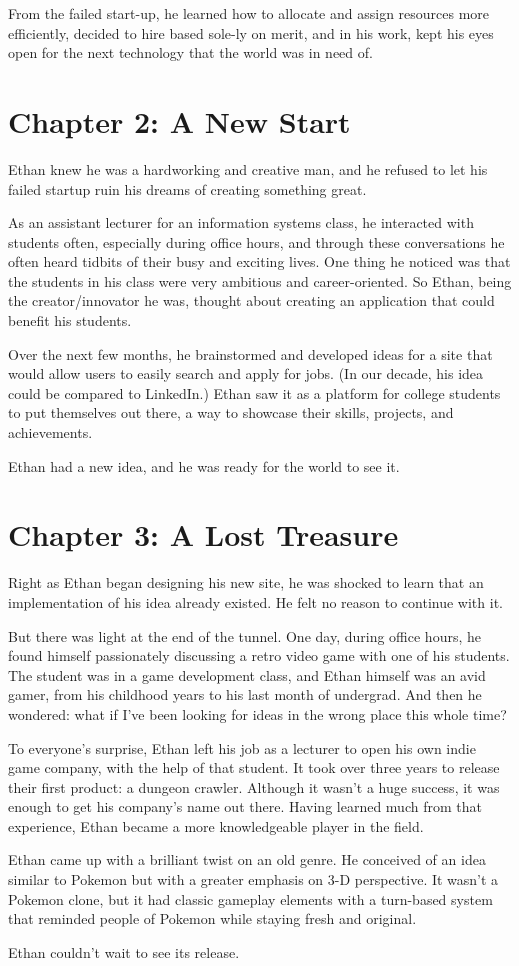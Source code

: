 \documentclass[a4paper,12pt,twoside]{book}
\begin{document}
From the failed start-up, he learned how to allocate and assign resources more efficiently, decided to hire based sole-ly on merit, and in his work, kept his eyes open for the next technology that the world was in need of.


\chapter{Chapter 2: A New Start}
Ethan knew he was a hardworking and creative man, and he refused to let his failed startup ruin his dreams of creating something great. 

As an assistant lecturer for an information systems class, he interacted with students often, especially during office hours, and through these conversations he often heard tidbits of their busy and exciting lives. One thing he noticed was that the students in his class were very ambitious and career-oriented. So Ethan, being the creator/innovator he was, thought about creating an application that could benefit his students. 

Over the next few months, he brainstormed and developed ideas for a site that would allow users to easily search and apply for jobs. (In our decade, his idea could be compared to LinkedIn.) Ethan saw it as a platform for college students to put themselves out there, a way to showcase their skills, projects, and achievements. 

Ethan had a new idea, and he was ready for the world to see it. 


\chapter{Chapter 3: A Lost Treasure}
Right as Ethan began designing his new site, he was shocked to learn that an implementation of his idea already existed. He felt no reason to continue with it.

But there was light at the end of the tunnel. One day, during office hours, he found himself passionately discussing a retro video game with one of his students. The student was in a game development class, and Ethan himself was an avid gamer, from his childhood years to his last month of undergrad. And then he wondered: what if I’ve been looking for ideas in the wrong place this whole time? 

To everyone’s surprise, Ethan left his job as a lecturer to open his own indie game company, with the help of that student. It took over three years to release their first product: a dungeon crawler. Although it wasn’t a huge success, it was enough to get his company’s name out there. Having learned much from that experience, Ethan became a more knowledgeable player in the field.

Ethan came up with a brilliant twist on an old genre. He conceived of an idea similar to Pokemon but with a greater emphasis on 3-D perspective. It wasn’t a Pokemon clone, but it had classic gameplay elements with a turn-based system that reminded people of Pokemon while staying fresh and original.

Ethan couldn’t wait to see its release.
\end{document}
